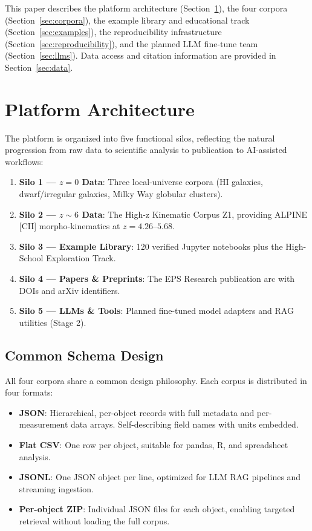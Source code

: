 \documentclass[twocolumn]{aastex631}
\begin{document}
This paper describes the platform architecture (Section~\ref{sec:architecture}),
the four corpora (Section~\ref{sec:corpora}), the example library and educational
track (Section~\ref{sec:examples}), the reproducibility infrastructure
(Section~\ref{sec:reproducibility}), and the planned LLM fine-tune team
(Section~\ref{sec:llms}). Data access and citation information are provided
in Section~\ref{sec:data}.

\section{Platform Architecture}
\label{sec:architecture}

The platform is organized into five functional silos, reflecting the natural
progression from raw data to scientific analysis to publication to AI-assisted
workflows:

\begin{enumerate}
\item \textbf{Silo 1 --- $z = 0$ Data}: Three local-universe corpora (HI galaxies,
      dwarf/irregular galaxies, Milky Way globular clusters).
\item \textbf{Silo 2 --- $z \sim 6$ Data}: The High-z Kinematic Corpus Z1,
      providing ALPINE [CII] morpho-kinematics at $z = 4.26$--$5.68$.
\item \textbf{Silo 3 --- Example Library}: 120 verified Jupyter notebooks
      plus the High-School Exploration Track.
\item \textbf{Silo 4 --- Papers \& Preprints}: The EPS Research publication
      arc with DOIs and arXiv identifiers.
\item \textbf{Silo 5 --- LLMs \& Tools}: Planned fine-tuned model adapters
      and RAG utilities (Stage 2).
\end{enumerate}

\subsection{Common Schema Design}
\label{sec:schema}

All four corpora share a common design philosophy. Each corpus is distributed in
four formats:

\begin{itemize}
\item \textbf{JSON}: Hierarchical, per-object records with full metadata and
      per-measurement data arrays. Self-describing field names with units embedded.
\item \textbf{Flat CSV}: One row per object, suitable for pandas, R, and
      spreadsheet analysis.
\item \textbf{JSONL}: One JSON object per line, optimized for LLM RAG pipelines
      and streaming ingestion.
\item \textbf{Per-object ZIP}: Individual JSON files for each object, enabling
      targeted retrieval without loading the full corpus.
\end{itemize}
\end{document}
